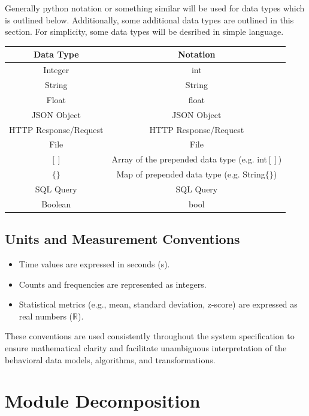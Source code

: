 \documentclass[12pt, titlepage]{article}
\begin{document}
\par{Generally python notation or something similar will be used for data types which is outlined below. Additionally, some additional data types are outlined in this section.
For simplicity, some data types will be desribed in simple language. }
\begin{center}
\begin{tabular}{ |c|c| } 
\hline
Data Type & Notation \\
\hline
Integer & int \\ 
\hline
String & String \\
\hline
Float & float \\
\hline
JSON Object & JSON Object \\
\hline
HTTP Response/Request & HTTP Response/Request \\
\hline
File & File \\
\hline
$[]$ & Array of the prepended data type (e.g. int$[]$) \\
\hline
$\{\}$ & Map of prepended data type (e.g. String$\{\}$) \\
\hline
SQL Query & SQL Query \\
\hline
Boolean & bool \\

\hline
\end{tabular}
\end{center}

\subsection*{Units and Measurement Conventions}
\begin{itemize}
    \item Time values are expressed in seconds (s).  
    \item Counts and frequencies are represented as integers.  
    \item Statistical metrics (e.g., mean, standard deviation, z-score) are expressed as real numbers (\(\mathbb{R}\)).
\end{itemize}

These conventions are used consistently throughout the system specification to ensure mathematical clarity and facilitate unambiguous interpretation of the behavioral data models, algorithms, and transformations.


\section{Module Decomposition}
\end{document}
